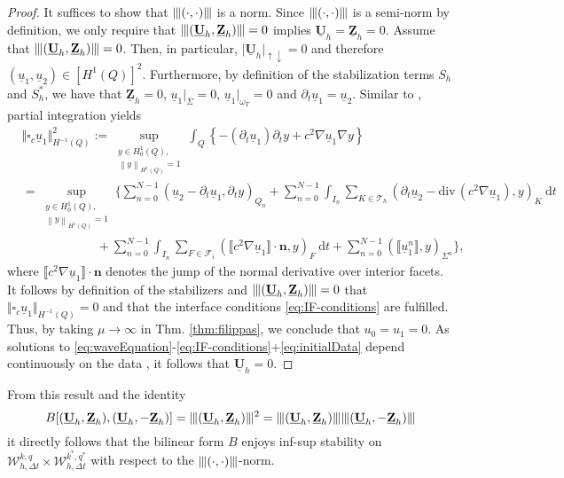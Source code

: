 \documentclass[sn-mathphys-num]{sn-jnl}
\numberwithin{equation}{section}
\newcommand{\jump}[1]{\llbracket#1\rrbracket}
\renewcommand{\div}{\mathrm{div}\,}  %
\newcommand{\wop}{\square_c}
\newcommand{\tnorm}[1]{\vert\hspace{-0.3mm}\Vert#1\Vert\hspace{-0.3mm}\vert}
\providecommand{\norm}[1]{\left\lVert#1\right\rVert}
\providecommand{\norm}[1]{\left\lVert#1\right\rVert}
\newcommand{\dT}{\mathrm{d}t}
\newcommand{\ProdFullyDiscrSpace}[2]{ \mathcal{W}^{ {#1},{#2}}_{h, \Delta t  } }
\newcommand{\Uh}{\underline{\mathbf{U}}_h}
\newcommand{\Zh}{\underline{\mathbf{Z}}_h}
\newcommand{\ul}{\underline{u}}
\newcommand{\dt}{\partial_t}
\begin{document}
\begin{proof}
    It suffices to show that $\tnorm{(\cdot,\cdot)}$ is a norm. Since $\tnorm{(\cdot,\cdot)}$ is a semi-norm by definition, we only require that $\tnorm{(\Uh,\Zh)} = 0$ implies $\Uh=\Zh= 0$. Assume that $\tnorm{(\Uh,\Zh)} = 0$. Then, in particular, $\vert \Uh \vert_{\uparrow \downarrow} = 0$ and therefore $(\ul_1,\ul_2) \in [H^1(Q)]^2$. Furthermore, by definition of the stabilization terms $S_h$ and $S_h^{\ast}$, we have that $\Zh = 0$, $\ul_1 \vert_{\Sigma} = 0$, $\ul_1 \vert_{\omega_T} = 0$ and $\dt \ul_1 = \ul_2$. Similar to \cite[Lem. 2.1]{BP24}, partial integration yields 
    \begin{align*}
	   & \Vert \wop \ul_1 \Vert^2_{H^{-1}(Q)} := \sup_{\substack{  y \in H^1_0(Q), \\ \norm{y}_{H^1(Q) } = 1  }} \int_{Q} \left\{ -(\dt \ul_1) \dt y + c^2 \nabla \ul_1 \nabla y \right\}  \\
        &= \sup_{\substack{  y \in H^1_0(Q), \\ \norm{y}_{H^1(Q) } = 1  }} \Big\{ \sum_{n = 0}^{N-1} (\ul_2 - \dt \ul_1, \dt y)_{Q_n} 
        + \sum_{n = 0}^{N-1} \int_{I_n} \sum_{K \in \mathcal{T}_h} (\dt \ul_2 - \div(c^2 \nabla \ul_1),y)_{K} \ \dT \\
	    & \hspace{6em} + \sum_{n = 0}^{N-1} \int_{I_n} \sum_{F \in \mathcal{F}_i} (\jump{c^2 \nabla \ul_1} \cdot \mathbf{n}, y)_F \ \dT + \sum_{n = 0}^{N-1} (\jump{\ul_1^n},y)_{\Sigma^n} \Big\},
    \end{align*}
where $\jump{c^2 \nabla \ul_1} \cdot \mathbf{n}$  denotes the jump of the normal derivative over interior facets. It follows by definition of the stabilizers and $\tnorm{(\Uh,\Zh)} = 0$ that $\Vert \wop \ul_1 \Vert_{H^{-1}(Q)} = 0$ and that the interface conditions \eqref{eq:IF-conditions} are fulfilled. Thus, by taking $\mu \rightarrow \infty$ in Thm. \ref{thm:filippas}, we conclude that $u_0 = u_1 = 0$. As solutions to \eqref{eq:waveEquation}-\eqref{eq:IF-conditions}+\eqref{eq:initialData} depend continuously on the data \cite{StolkPhD}, it follows that $\Uh = 0$. 
\end{proof}

\noindent From this result and the identity
\[
B[(\Uh,\Zh),(\Uh,-\Zh)] = \tnorm{(\Uh,\Zh)}^2 = \tnorm{(\Uh,\Zh)}\tnorm{(\Uh,-\Zh)}
\]
it directly follows that the bilinear form $B$ enjoys inf-sup stability on $\ProdFullyDiscrSpace{k}{q} \times \ProdFullyDiscrSpace{k^\ast}{q^\ast}$ with respect to the $\tnorm{(\cdot,\cdot)}$-norm. 
\end{document}
